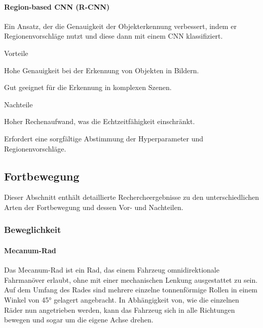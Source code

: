 \documentclass[../main.tex]{subfiles}
\begin{document}
\paragraph{Region-based CNN (R-CNN)}

Ein Ansatz, der die Genauigkeit der Objekterkennung verbessert, indem er Regionenvorschläge nutzt und diese dann mit einem CNN klassifiziert.

\begin{minipage}[t]{0.48\textwidth}
    \begin{items}
      \item [Vorteile]
      \item Hohe Genauigkeit bei der Erkennung von Objekten in Bildern.
      \item Gut geeignet für die Erkennung in komplexen Szenen.
    \end{items}
\end{minipage}
\hfill
\begin{minipage}[t]{0.48\textwidth}
    \begin{items}
      \item [Nachteile]
      \item Hoher Rechenaufwand, was die Echtzeitfähigkeit einschränkt.
      \item Erfordert eine sorgfältige Abstimmung der Hyperparameter und Regionenvorschläge.
    \end{items}
\end{minipage}

\newpage
\subsection{Fortbewegung}

Dieser Abschnitt enthält detaillierte Rechercheergebnisse zu den unterschiedlichen Arten der Fortbewegung und dessen Vor- und Nachteilen.

\subsubsection{Beweglichkeit}

\paragraph{Mecanum-Rad} \label{recherche-mecanum-rad}

Das Mecanum-Rad ist ein Rad, das einem Fahrzeug omnidirektionale Fahrmanöver erlaubt, ohne mit einer mechanischen Lenkung ausgestattet zu sein.
Auf dem Umfang des Rades sind mehrere einzelne tonnenförmige Rollen in einem Winkel von 45° gelagert angebracht. 
In Abhängigkeit von, wie die einzelnen Räder nun angetrieben werden, kann das Fahrzeug sich in alle Richtungen bewegen und sogar um die eigene Achse drehen.
\end{document}
